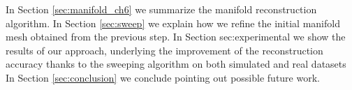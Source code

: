 

In Section \ref{sec:manifold_ch6} we summarize the manifold reconstruction algorithm. 
In Section \ref{sec:sweep} we explain how we refine the initial manifold mesh obtained from the previous step. In Section sec:experimental we show the results of our approach, underlying the improvement of the reconstruction accuracy thanks to the sweeping algorithm on both simulated and real datasets In Section \ref{sec:conclusion} we conclude pointing out possible future work.
% 
% 
